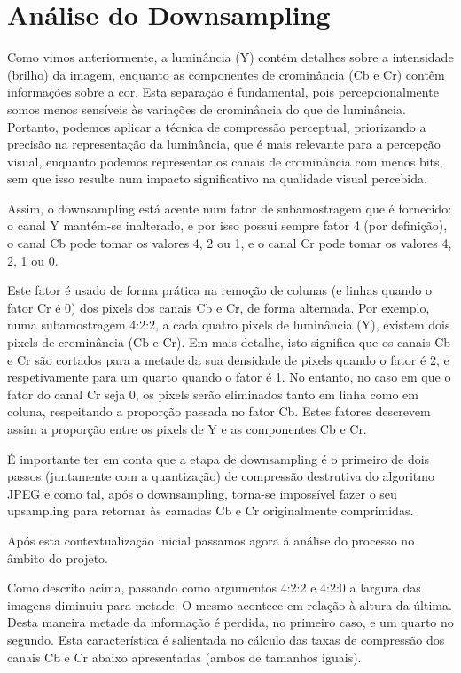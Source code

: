 \documentclass{article}
\begin{document}
\newpage
\section{Análise do Downsampling}
Como vimos anteriormente, a luminância (Y) contém detalhes sobre a intensidade (brilho) da imagem, enquanto as componentes de crominância (Cb e Cr) contêm informações sobre a cor. Esta separação é fundamental, pois percepcionalmente somos menos sensíveis às variações de crominância do que de luminância. Portanto, podemos aplicar a técnica de compressão perceptual, priorizando a precisão na representação da luminância, que é mais relevante para a percepção visual, enquanto podemos representar os canais de crominância com menos bits, sem que isso resulte num impacto significativo na qualidade visual percebida.

Assim, o downsampling está acente num fator de subamostragem que é fornecido: o canal Y mantém-se inalterado, e por isso possui sempre fator 4 (por definição), o canal Cb pode tomar os valores 4, 2 ou 1, e o canal Cr pode tomar os valores 4, 2, 1 ou 0. 

Este fator é usado de forma prática na remoção de colunas (e linhas quando o fator Cr é 0) dos pixels dos canais Cb e Cr, de forma alternada. Por exemplo, numa subamostragem 4:2:2, a cada quatro pixels de luminância (Y), existem dois pixels de crominância (Cb e Cr). Em mais detalhe, isto significa que os canais Cb e Cr são cortados para a metade da sua densidade de pixels quando o fator é 2, e respetivamente para um quarto quando o fator é 1. No entanto, no caso em que o fator do canal Cr seja 0, os pixels serão eliminados tanto em linha como em coluna, respeitando a proporção passada no fator Cb. Estes fatores descrevem assim a proporção entre os pixels de Y e as componentes Cb e Cr.

É importante ter em conta que a etapa de downsampling é o primeiro de dois passos (juntamente com a quantização) de compressão destrutiva do algoritmo JPEG e como tal, após o downsampling, torna-se impossível fazer o seu upsampling para retornar às camadas Cb e Cr originalmente comprimidas.

Após esta contextualização inicial passamos agora à análise do processo no âmbito do projeto.

Como descrito acima, passando como argumentos 4:2:2 e 4:2:0 a largura das imagens diminuiu para metade. O mesmo acontece em relação à altura da última. Desta maneira metade da informação é perdida, no primeiro caso, e um quarto no segundo. Esta característica é salientada no cálculo das taxas de compressão dos canais Cb e Cr abaixo apresentadas (ambos de tamanhos iguais).
\end{document}
